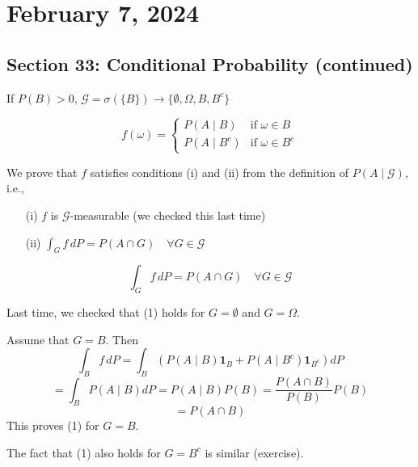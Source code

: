 \newpage
\section{February 7, 2024}

\subsection{Section 33: Conditional Probability (continued)}

\begin{example}
    
If \( P(B) > 0 \), \(\mathcal{G} = \sigma(\{B\}) \rightarrow \{\emptyset, \Omega, B, B^c\}\)

\[
f(\omega) = 
\begin{cases} 
P(A \mid B) & \text{if } \omega \in B \\
P(A \mid B^c) & \text{if } \omega \in B^c 
\end{cases}
\]

We prove that \( f \) satisfies conditions (i) and (ii) from the definition of \( P(A \mid \mathcal{G}) \), i.e.,
\begin{itemize}
    \item[(i)] \( f \) is \(\mathcal{G}\)-measurable (we checked this last time)
    \item[(ii)] \(\int_G f \, dP = P(A \cap G) \quad \forall G \in \mathcal{G} \)
\end{itemize}
\[
\int_G f \, dP = P(A \cap G) \quad \forall G \in \mathcal{G} \tag{1}
\]

Last time, we checked that (1) holds for \( G = \emptyset \) and \( G = \Omega \).

Assume that \( G = B \). Then
\[
\int_B f \, dP = \int_B \left( P(A \mid B) \mathbf{1}_B + P(A \mid B^c) \mathbf{1}_{B^c} \right) dP 
\]
\[
= \int_B P(A \mid B) dP = P(A \mid B) P(B) = \frac{P(A \cap B)}{P(B)} P(B)
\]
\[
= P(A \cap B)
\]
This proves (1) for \( G = B \).

The fact that (1) also holds for \( G = B^c \) is similar (exercise).

\end{example}


